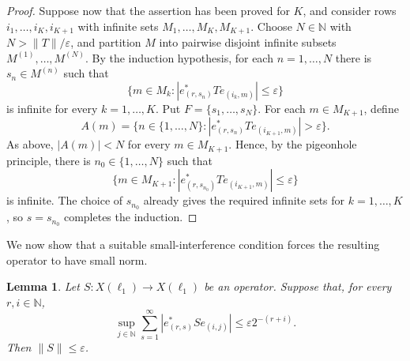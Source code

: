 \documentclass[11pt]{amsart}
\theoremstyle{plain}
\newtheorem{lemma}[theorem]{Lemma}
\theoremstyle{definition}
\numberwithin{equation}{section}
\newcommand{\norm}[1]{\lVert #1 \rVert}
\newcommand{\N}{\mathbb{N}}
\renewcommand{\leq}{\leqslant}
\begin{document}
\begin{proof}
    Suppose now that the assertion has been proved for $K$, and consider rows $i_1,\dots,i_K,i_{K+1}$ with infinite sets $M_1,\dots,M_K,M_{K+1}$. Choose $N\in\N$ with $N>\|T\|/\varepsilon$, and partition $M$ into pairwise disjoint infinite subsets $M^{(1)},\dots,M^{(N)}$. By the induction hypothesis, for each $n=1,\dots,N$ there is $s_n\in M^{(n)}$ such that
    \begin{equation*}
        \{m\in M_k: |e_{(r,s_n)}^*T e_{(i_k,m)}|\leq\varepsilon\}
    \end{equation*}
    is infinite for every $k=1,\dots,K$. Put $F=\{s_1,\dots,s_N\}$. For each $m\in M_{K+1}$, define
    \begin{equation*}
        A(m)=\{n\in\{1,\dots,N\}: |e_{(r,s_n)}^*T e_{(i_{K+1},m)}|>\varepsilon\}.
    \end{equation*}
    As above, $|A(m)|<N$ for every $m\in M_{K+1}$. Hence, by the pigeonhole principle, there is $n_0\in\{1,\dots,N\}$ such that
    \begin{equation*}
        \{m\in M_{K+1}: |e_{(r,s_{n_0})}^*T e_{(i_{K+1},m)}|\leq\varepsilon\}
    \end{equation*}
    is infinite. The choice of $s_{n_0}$ already gives the required infinite sets for $k=1,\dots,K$, so $s=s_{n_0}$ completes the induction.
\end{proof}

We now show that a suitable small-interference condition forces the resulting operator to have small norm.

\begin{lemma}\label{lmm: ell1-small-operator}
    Let $S \colon X(\ell_1) \to X(\ell_1)$ be an operator. Suppose that, for every $r,i \in \N$,
    \begin{equation*}
        \sup_{j \in \N} \sum_{s=1}^\infty |e^*_{(r,s)} S e_{(i,j)}|
        \leq
        \varepsilon 2^{-(r+i)}.
    \end{equation*}
    Then  $\norm{S} \leq \varepsilon$.
\end{lemma}
\end{document}
